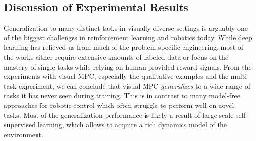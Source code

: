 \subsection{Discussion of Experimental Results}

Generalization to many distinct tasks in visually diverse settings is arguably one of the biggest challenges in reinforcement learning and robotics today. While deep learning has relieved us from much of the problem-specific engineering, most of the works either require extensive amounts of labeled data or focus on the mastery of single tasks while relying on human-provided reward signals. 
From the experiments with visual MPC, especially the qualitative examples and the multi-task experiment, we can conclude that visual MPC \emph{generalizes} to a wide range of tasks it has never seen during training. This is in contrast to many model-free approaches for robotic control which often struggle to perform well on novel tasks. Most of the generalization performance is likely a result of large-scale self-supervised learning, which allows to acquire a rich dynamics model of the environment. 